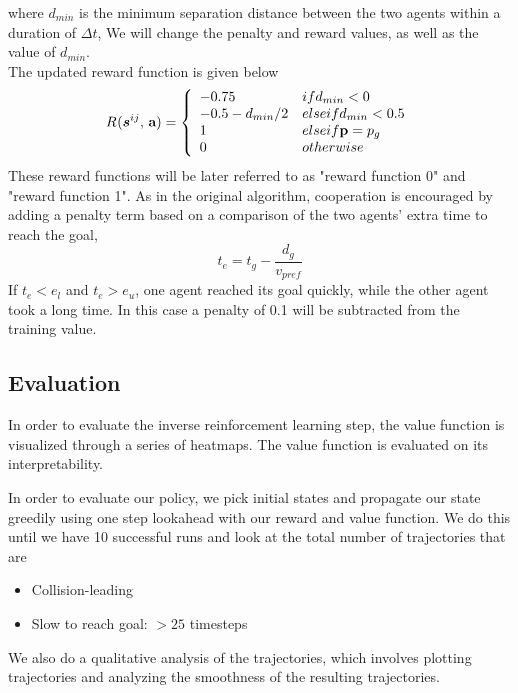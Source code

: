 \documentclass[conference]{IEEEtran}
\begin{document}
where $d_{min}$ is the minimum separation distance between
the two agents within a duration of $\Delta t$,
We will change the penalty and reward values, as well as the value of $d_{min}$.\\
The updated reward function is given below
\begin{equation} 
\Reward{}(\state{ij}{}, \, \textbf{a})=
\left\{
    \begin{array}{ll}
        -0.75 & \mbox{if } d_{min}<0  \\
        -0.5 - d_{min}/2 & \mbox{else if } d_{min}<0.5\\
        1 & \mbox{else if }  \textbf{p}=p_{g} \\
        0 & \mbox{otherwise }\\
    \end{array}
\right. 
\label{eqn:reward2}
\end{equation}
These reward functions will be later referred to as "reward function 0" and "reward function 1". 
As in the original algorithm, cooperation is encouraged by adding a penalty term based on a comparison of the two agents’ extra time to reach the goal,
\begin{equation} 
t_{e} = t_{g}- \frac{d_{g}}{v_{pref}} 
\end{equation}
If $t_{e} < e_{l}$ and $t_{e} > e_{u}$, one agent reached its goal quickly, while the other agent took a long time. In this case a penalty of 0.1 will be subtracted from
the training value. 

\subsection{Evaluation}

In order to evaluate the inverse reinforcement learning step, the value function is visualized through a series of heatmaps. The value function is evaluated on its interpretability. 

In order to evaluate our policy, we pick initial states and propagate our state greedily using one step lookahead with our reward and value function. We do this until we have 10 successful runs and look at the total number of trajectories that are

\begin{itemize}
    \item Collision-leading
    \item Slow to reach goal: $>25$ timesteps
\end{itemize}

We also do a qualitative analysis of the trajectories, which involves plotting trajectories and analyzing the smoothness of the resulting trajectories.
\end{document}
